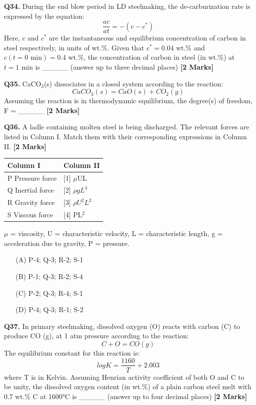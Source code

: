 \documentclass[11pt]{article}
\newcommand{\questionb}[2]{
    \noindent\textbf{Q#2.} #1 \hfill \textbf{[2 Marks]}
}
\begin{document}
\questionb{During the end blow period in LD steelmaking, the de-carburization rate is expressed by the equation:
\[\frac{ac}{at} = -(c - c^*)\]
Here, \(c\) and \(c^*\) are the instantaneous and equilibrium concentration of carbon in steel respectively, in units of wt.\%. Given that \(c^* = 0.04\) wt.\% and \(c (t = 0 \text{ min}) = 0.4\) wt.\%, the concentration of carbon in steel (in wt.\%) at \(t = 1 \text{ min}\) is \_\_\_\_\_ (answer up to three decimal places)}{34}
\vspace{0.5cm}

\questionb{CaCO\(_3\)(s) dissociates in a closed system according to the reaction:
\[CaCO_3(s) = CaO(s) + CO_2(g)\]
Assuming the reaction is in thermodynamic equilibrium, the degree(s) of freedom, F = \_\_\_\_\_}{35}
\vspace{0.5cm}

\questionb{A ladle containing molten steel is being discharged. The relevant forces are listed in Column I. Match them with their corresponding expressions in Column II.}{36}
\begin{center}
\begin{tabular}{|l|l|}
\hline
\textbf{Column I} & \textbf{Column II} \\
\hline
P Pressure force & [1] \(\mu\)UL \\
Q Inertial force & [2] \(\rho gL^3\) \\
R Gravity force & [3] \(\rho U^2L^2\) \\
S Viscous force & [4] PL\(^2\) \\
\hline
\end{tabular}
\end{center}
\(\mu\) = viscosity, U = characteristic velocity, L = characteristic length, g = acceleration due to gravity, P = pressure.
\begin{enumerate}
    \item[(A)] P-4; Q-3; R-2; S-1
    \item[(B)] P-1; Q-3; R-2; S-4
    \item[(C)] P-2; Q-3; R-4; S-1
    \item[(D)] P-4; Q-3; R-1; S-2
\end{enumerate}
\vspace{0.5cm}

\questionb{In primary steelmaking, dissolved oxygen (O) reacts with carbon (C) to produce CO (g), at 1 atm pressure according to the reaction:
\[C + O = CO (g)\]
The equilibrium constant for this reaction is:
\[logK = \frac{1160}{T} + 2.003\]
where T is in Kelvin. Assuming Henrian activity coefficient of both O and C to be unity, the dissolved oxygen content (in wt.\%) of a plain carbon steel melt with 0.7 wt.\% C at 1600°C is \_\_\_\_\_ (answer up to four decimal places)}{37}
\vspace{0.5cm}
\end{document}
